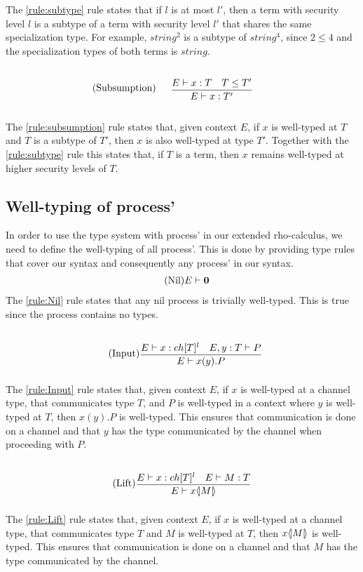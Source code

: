 The \ref{rule:subtype} rule states that if $l$ is at most $l'$, then a term with security level $l$ is a subtype of a term with security level $l'$ that shares the same specialization type.
For example, $string^2$ is a subtype of $string^4$, since $2\leq4$ and the specialization types of both terms is $string$.

\begin{align*}
    \tag{Subsumption}\label{rule:subsumption} &\infrule{E\vdash x:T\quad T\leq T'}{E\vdash x:T'}
\end{align*}

The \ref{rule:subsumption} rule states that, given context $E$, if $x$ is well-typed at $T$ and $T$ is a subtype of $T'$, then $x$ is also well-typed at type $T'$.
Together with the \ref{rule:subtype} rule this states that, if $T$ is a term, then $x$ remains well-typed at higher security levels of $T$.

\subsection{Well-typing of process'}
In order to use the type system with process' in our extended rho-calculus, we need to define the well-typing of all process'.
This is done by providing type rules that cover our syntax and consequently any process' in our syntax.
\begin{align*}
    \tag{Nil}\label{rule:Nil} &E \vdash \mathbf{0}
\end{align*}
The \ref{rule:Nil} rule states that any nil process is trivially well-typed.
This is true since the process contains no types.

\begin{align*}
    \tag{Input}\label{rule:Input} &\infrule{E\vdash x:ch[T]^l\quad E,y:T\vdash P}{E \vdash \inp{x}{y}P}
\end{align*}
The \ref{rule:Input} rule states that, given context $E$, if $x$ is well-typed at a channel type, that communicates type $T$, and $P$ is well-typed in a context where $y$ is well-typed at $T$, then $x(y).P$ is well-typed.
This ensures that communication is done on a channel and that $y$ has the type communicated by the channel when proceeding with $P$.

\begin{align*}
    \tag{Lift}\label{rule:Lift} &\infrule{E\vdash x:ch[T]^l\quad E \vdash M:T}{E\vdash \lift{x}{M}}
\end{align*}
The \ref{rule:Lift} rule states that, given context $E$, if $x$ is well-typed at a channel type, that communicates type $T$ and $M$ is well-typed at $T$, then $x \langle \! | M | \! \rangle$ is well-typed.
This ensures that communication is done on a channel and that $M$ has the type communicated by the channel.

